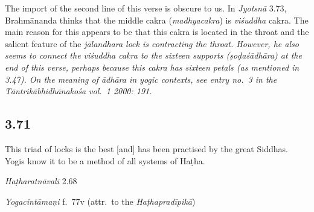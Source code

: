 \begin{ekdosis}
\begin{philcomm}[hp03_070]
The import of the second line of this verse is obscure to us. In \emph{Jyotsnā} 3.73, Brahmānanda thinks that the middle cakra (\emph{madhyacakra}) is \emph{viśuddha} cakra. The main reason for this appears to be that this cakra is located in the throat and the salient feature of the \sl{jālandhara} lock is contracting the throat. However, he also seems to connect the \emph{viśuddha} cakra to the sixteen supports (\emph{ṣoḍaśādhāra}) at the end of this verse, perhaps because this cakra has sixteen petals (as mentioned in 3.47). On the meaning of \emph{ādhāra} in yogic contexts, see entry no.~3 in the \emph{Tāntrikābhidhānakośa} vol.~1 2000: 191.
\end{philcomm}


\subsection*{3.71}
\begin{translation}[hp03_071]
This triad of locks is the best [and] has been practised by the great Siddhas. Yogis know it to be a method of all systems of Haṭha.
\end{translation}


\begin{testimonia}[hp03_071]
\emph{Haṭharatnāvalī} 2.68
\begin{versinnote}
\end{versinnote}

\emph{Yogacintāmaṇi} f.~77v (attr.~to the \emph{Haṭhapradīpikā})
\begin{versinnote}
\end{versinnote}


\end{testimonia}
\end{ekdosis}
